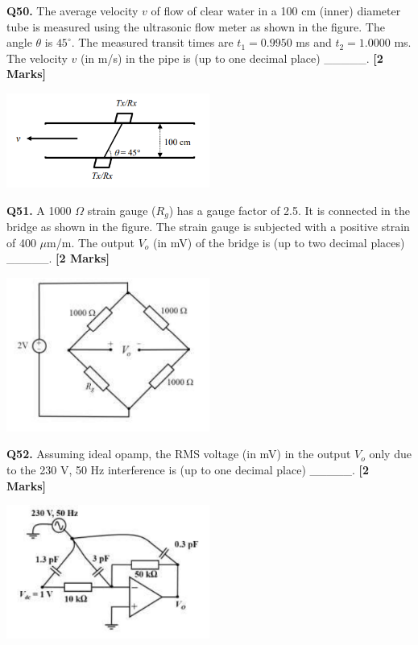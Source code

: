 \documentclass[11pt]{article}
\newcommand{\questionb}[2]{
    \noindent\textbf{Q#2.} #1 \hfill \textbf{[2 Marks]}
}
\begin{document}
\questionb{The average velocity \(v\) of flow of clear water in a 100 cm (inner) diameter tube is measured using the ultrasonic flow meter as shown in the figure. The angle \(\theta\) is \(45^\circ\). The measured transit times are \(t_1 = 0.9950\) ms and \(t_2 = 1.0000\) ms. The velocity \(v\) (in m/s) in the pipe is (up to one decimal place) \_\_\_\_\_.}{50}
\begin{center}
\includegraphics[width=0.5\textwidth]{figures/50.png}
\end{center}
\vspace{0.5cm}

\questionb{A 1000 \(\Omega\) strain gauge (\(R_g\)) has a gauge factor of 2.5. It is connected in the bridge as shown in the figure. The strain gauge is subjected with a positive strain of 400 \(\mu\)m/m. The output \(V_o\) (in mV) of the bridge is (up to two decimal places) \_\_\_\_\_.}{51}
\begin{center}
\includegraphics[width=0.5\textwidth]{figures/51.png}
\end{center}
\vspace{0.5cm}

\questionb{Assuming ideal opamp, the RMS voltage (in mV) in the output \(V_o\) only due to the 230 V, 50 Hz interference is (up to one decimal place) \_\_\_\_\_.}{52}
\begin{center}
\includegraphics[width=0.5\textwidth]{figures/52.png}
\end{center}
\vspace{0.5cm}
\end{document}
